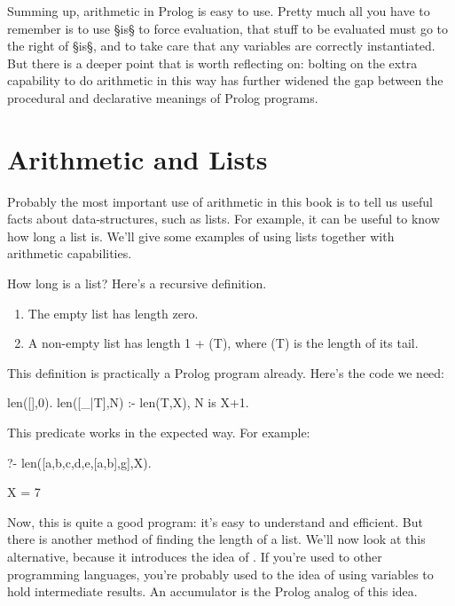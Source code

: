 Summing up, arithmetic in Prolog is easy to use.  Pretty much all you
have to remember is to use §is§ to force evaluation, that stuff to be
evaluated must go to the right of §is§, and to take care that any
variables are correctly instantiated.  But there is a deeper point
that is worth reflecting on: bolting on the extra capability to do
arithmetic in this way has further widened the gap between the
procedural and declarative meanings of Prolog programs.





\section{Arithmetic and Lists}\label{SEC.L5.ARITHMETIC-AND-LISTS}

Probably the most important use of arithmetic in this book is to tell
us useful facts about data-structures, such as lists.  For example, it
can be useful to know how long a list is.  We'll give some examples of
using lists together with arithmetic capabilities.

How long is a list? Here's a recursive definition.
\begin{enumerate}
\item{}The empty list has length zero.
\item{}A non-empty list has length
         1 + (T), where (T) is the length of its
        tail.
\end{enumerate}


This definition is practically a Prolog program already.  Here's the
code we need:
\begin{LPNcodedisplay}
len([],0).
len([_|T],N) :- len(T,X), N is X+1.
\end{LPNcodedisplay}

This predicate works in the expected way.
For example:
\begin{LPNcodedisplay}
?- len([a,b,c,d,e,[a,b],g],X).

X = 7
\end{LPNcodedisplay}

\clearpage
Now, this is quite a good program: it's easy to understand and
efficient.  But there is another method of finding the length of a
list.  We'll now look at this alternative, because it introduces the
idea of . If you're used to other programming
languages, you're probably used to the idea of using variables to hold
intermediate results.  An accumulator is the Prolog analog of this
idea.



